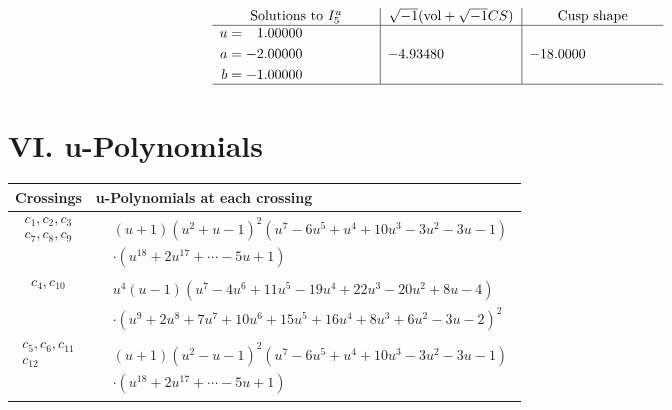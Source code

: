 \documentclass[1p]{elsarticle_modified}
\theoremstyle{definition}
\newcommand{\I}{\sqrt{-1}}
\begin{document}
$$\begin{array}{c|c|c}  
\text{Solutions to }I^u_{5}& \I (\text{vol} + \sqrt{-1}CS) & \text{Cusp shape}\\
 \hline 
\begin{aligned}
u &= \phantom{-}1.00000\phantom{ +0.000000I} \\
a &= -2.00000\phantom{ +0.000000I} \\
b &= -1.00000\phantom{ +0.000000I}\end{aligned}
 & -4.93480\phantom{ +0.000000I} & -18.0000\phantom{ +0.000000I}\\
 \hline 
 \end{array}$$\newpage
\newpage\renewcommand{\arraystretch}{1}
\centering \section*{ VI. u-Polynomials}
\begin{tabular}{m{50pt}|m{274pt}}
Crossings & \hspace{64pt}u-Polynomials at each crossing \\
\hline $$\begin{aligned}c_{1},c_{2},c_{3}\\c_{7},c_{8},c_{9}\end{aligned}$$&$\begin{aligned}
&(u+1)(u^2+u-1)^2(u^7-6 u^5+u^4+10 u^3-3 u^2-3 u-1)\\
&\cdot(u^{18}+2 u^{17}+\cdots-5 u+1)
\end{aligned}$\\
\hline $$\begin{aligned}c_{4},c_{10}\end{aligned}$$&$\begin{aligned}
&u^4(u-1)(u^7-4 u^6+11 u^5-19 u^4+22 u^3-20 u^2+8 u-4)\\
&\cdot(u^9+2 u^8+7 u^7+10 u^6+15 u^5+16 u^4+8 u^3+6 u^2-3 u-2)^2
\end{aligned}$\\
\hline $$\begin{aligned}c_{5},c_{6},c_{11}\\c_{12}\end{aligned}$$&$\begin{aligned}
&(u+1)(u^2- u-1)^2(u^7-6 u^5+u^4+10 u^3-3 u^2-3 u-1)\\
&\cdot(u^{18}+2 u^{17}+\cdots-5 u+1)
\end{aligned}$\\
\hline
\end{tabular}\newpage\renewcommand{\arraystretch}{1}
\end{document}
